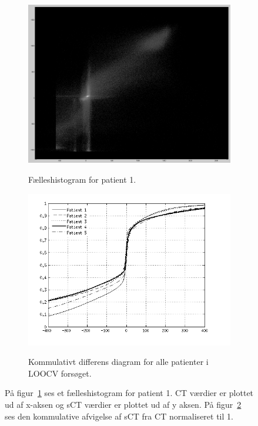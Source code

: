 \begin{figure}
    \centering
    \begin{subfigure}[b]{0.47\textwidth}
    	\caption{Fælleshistogram for patient 1.}
        \includegraphics[width=1\textwidth]{billeder/loocv_joint_histogram.png}
        \label{fig:loocv_j_h}
    \end{subfigure}\hfill
    \begin{subfigure}[b]{0.47\textwidth}
        \caption{Kommulativt differens diagram for alle patienter i LOOCV forsøget.}
        \includegraphics[width=1\textwidth]{billeder/cumm_diff_loocv.png}
        \label{fig:cumm_diff_loocv}
    \end{subfigure}
    \caption{På figur~\ref{fig:loocv_j_h} ses et fælleshistogram for patient 1. CT værdier er plottet ud af x-aksen og sCT værdier er plottet ud af y aksen. På figur~\ref{fig:cumm_diff_loocv} ses den kommulative afvigelse af sCT fra CT normaliseret til 1.}
    \label{fig:loocv}
\end{figure}

